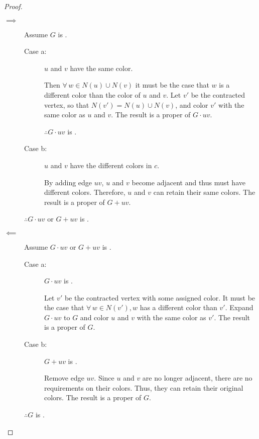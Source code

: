 \begin{proof}
  \begin{description}
  \item[]
  \item[\(\implies\)] Assume \(G\) is .

    \begin{description}
    \item [Case a:] \(u\) and \(v\) have the same color.

      Then \(\forall\,w\in N(u)\cup N(v)\) it must be the case that \(w\) is a different color than the color of
      \(u\) and \(v\).  Let \(v'\) be the contracted vertex, so that \(N(v')=N(u)\cup N(v)\), and color \(v'\) with
      the same color as \(u\) and \(v\).  The result is a proper  of \(G\cdot uv\).

      \(\therefore G\cdot uv\) is .
      
    \item [Case b:] \(u\) and \(v\) have the different colors in \(c\).

      By adding edge \(uv\), \(u\) and \(v\) become adjacent and thus must have different colors.  Therefore, \(u\)
      and \(v\) can retain their same colors.  The result is a proper  of \(G+uv\).
    \end{description}

    \(\therefore G\cdot uv\) or \(G+uv\) is .
    
  \item[\(\impliedby\)] Assume \(G\cdot uv\) or \(G+uv\) is .

    \begin{description}
    \item [Case a:] \(G\cdot uv\) is .

      Let \(v'\) be the contracted vertex with some assigned color.  It must be the case that \(\forall\,w\in
      N(v'), w\) has a different color than \(v'\).  Expand \(G\cdot uv\) to \(G\) and color \(u\) and \(v\) with
      the same color as \(v'\).  The result is a proper  of \(G\).
      
    \item [Case b:] \(G+uv\) is .

      Remove edge \(uv\).  Since \(u\) and \(v\) are no longer adjacent, there are no requirements on their colors.
      Thus, they can retain their original colors.  The result is a proper  of \(G\).
    \end{description}

    \(\therefore G\) is .
  \end{description}
\end{proof}
